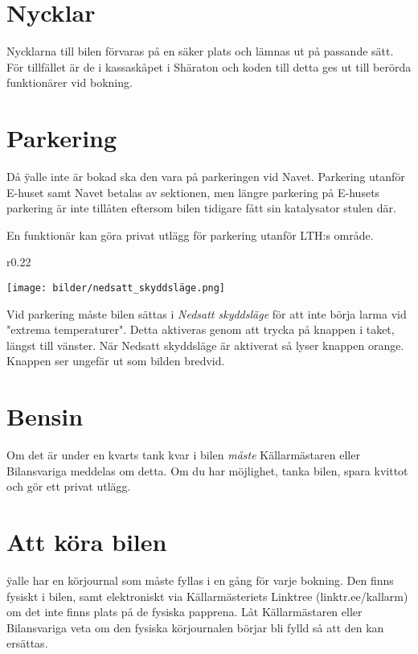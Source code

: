 \documentclass{dsekprotokoll}
\begin{document}
\section{Nycklar}
Nycklarna till bilen förvaras på en säker plats och lämnas ut på passande sätt. För tillfället är de i kassaskåpet i Shäraton och koden till detta ges ut till berörda funktionärer vid bokning.

\section{Parkering}

Då \"yalle inte är bokad ska den vara på parkeringen vid Navet. Parkering utanför E-huset samt Navet betalas av sektionen, men längre parkering på E-husets parkering är inte tillåten eftersom bilen tidigare fått sin katalysator stulen där. 

En funktionär kan göra privat utlägg för parkering utanför LTH:s område. 

\begin{wrapfigure}[3]{r}{0.22\textwidth}
    \raggedright
    \vspace{-0.6cm}
    \texttt{[image: bilder/nedsatt\_skyddsläge.png]}
\end{wrapfigure}

Vid parkering måste bilen sättas i \emph{Nedsatt skyddsläge} för att inte börja larma vid "extrema temperaturer". Detta aktiveras genom att trycka på knappen i taket, längst till vänster. När Nedsatt skyddsläge är aktiverat så lyser knappen orange. Knappen ser ungefär ut som bilden bredvid.

\section{Bensin} 
Om det är under en kvarts tank kvar i bilen \emph{måste} Källarmästaren eller Bilansvariga meddelas om detta. Om du har möjlighet, tanka bilen, spara kvittot och gör ett privat utlägg.

\section{Att köra bilen} 

\"yalle har en körjournal som måste fyllas i en gång för varje bokning. Den finns fysiskt i bilen, samt elektroniskt via Källarmästeriets Linktree (linktr.ee/kallarm) om det inte finns plats på de fysiska papprena. Låt Källarmästaren eller Bilansvariga veta om den fysiska körjournalen börjar bli fylld så att den kan ersättas. 
\end{document}
